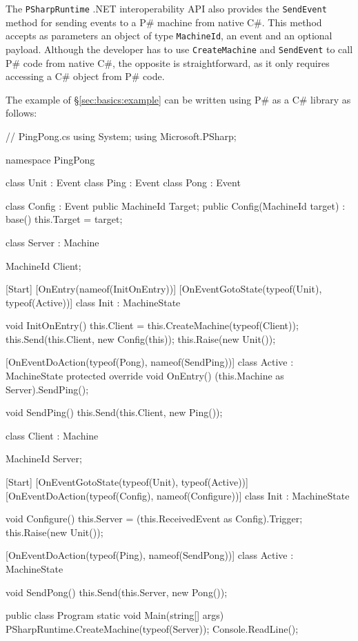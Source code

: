 \documentclass{llncs}
\newcommand{\ps}{P\#\xspace}
\newcommand{\cs}{C\#\xspace}
\begin{document}
The \texttt{PSharpRuntime} .NET interoperability API also provides the \texttt{SendEvent} method for sending events to a \ps machine from native \cs. This method accepts as parameters an object of type \texttt{MachineId}, an event and an optional payload. Although the developer has to use \texttt{CreateMachine} and \texttt{SendEvent} to call \ps code from native \cs, the opposite is straightforward, as it only requires accessing a \cs object from \ps code.

The example of \S\ref{sec:basics:example} can be written using \ps as a \cs library as follows:

\begin{psharp}
// PingPong.cs
using System;
using Microsoft.PSharp;

namespace PingPong {
  class Unit : Event { }
  class Ping : Event { }
  class Pong : Event { }
  
  class Config : Event {
    public MachineId Target;
    public Config(MachineId target) : base() {
      this.Target = target;
    }
  }
  
  class Server : Machine {
    MachineId Client;
    
    [Start]
    [OnEntry(nameof(InitOnEntry))]
    [OnEventGotoState(typeof(Unit), typeof(Active))]
    class Init : MachineState { }
    
    void InitOnEntry() {
      this.Client = this.CreateMachine(typeof(Client));
      this.Send(this.Client, new Config(this));
      this.Raise(new Unit());
    }
    
    [OnEventDoAction(typeof(Pong), nameof(SendPing))]
    class Active : MachineState {
      protected override void OnEntry() {
        (this.Machine as Server).SendPing();
      }
    }
    
    void SendPing() {
      this.Send(this.Client, new Ping());
    }
  }
  
  class Client : Machine {
    MachineId Server;
    
    [Start]
    [OnEventGotoState(typeof(Unit), typeof(Active))]
    [OnEventDoAction(typeof(Config), nameof(Configure))]
    class Init : MachineState { }
    
    void Configure() {
      this.Server = (this.ReceivedEvent as Config).Trigger;
      this.Raise(new Unit());
    }
    
    [OnEventDoAction(typeof(Ping), nameof(SendPong))]
    class Active : MachineState { }
    
    void SendPong() {
      this.Send(this.Server, new Pong());
    }
  }
  
  public class Program {
    static void Main(string[] args) {
      PSharpRuntime.CreateMachine(typeof(Server));
      Console.ReadLine();
    }
  }
}
\end{psharp}
\end{document}
